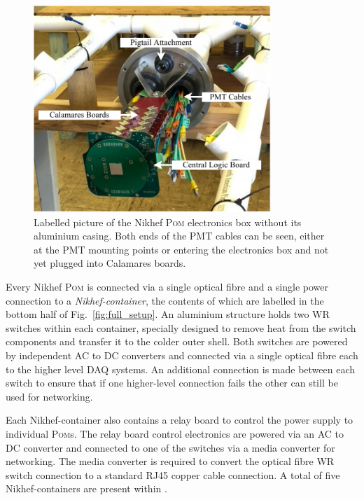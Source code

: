 \begin{figure} %
    \includegraphics[width=0.8\textwidth]{diagrams/5-daq/nikhef_plane.pdf}
    \caption[Labelled picture of the Nikhef \textsc{Pom} electronics box]
    {Labelled picture of the Nikhef \textsc{Pom} electronics box without its aluminium casing.
        Both ends of the PMT cables can be seen, either at the PMT mounting points or entering the
        electronics box and not yet plugged into Calamares boards.}
    \label{fig:nikhef_plane}
\end{figure}

Every Nikhef \textsc{Pom} is connected via a single optical fibre and a single power connection to
a \emph{Nikhef-container}, the contents of which are labelled in the bottom half of
Fig.~\ref{fig:full_setup}. An aluminium structure holds two WR switches within each container,
specially designed to remove heat from the switch components and transfer it to the colder outer
shell. Both switches are powered by independent AC to DC converters and connected via a single
optical fibre each to the higher level DAQ systems. An additional connection is made between each
switch to ensure that if one higher-level connection fails the other can still be used for
networking.

Each Nikhef-container also contains a relay board to control the power supply to individual
\textsc{Pom}s. The relay board control electronics are powered via an AC to DC converter and
connected to one of the switches via a media converter for networking. The media converter is
required to convert the optical fibre WR switch connection to a standard RJ45 copper cable
connection. A total of five Nikhef-containers are present within \chipsfive.

